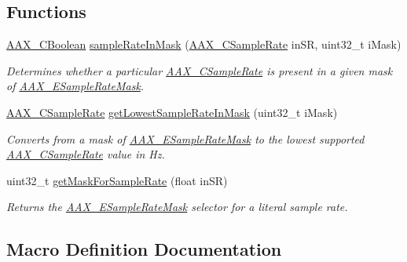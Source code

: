 \subsection*{Functions}
\begin{DoxyCompactItemize}
\item 
\mbox{\hyperlink{a00392_aa216506530f1d19a2965931ced2b274b}{A\+A\+X\+\_\+\+C\+Boolean}} \mbox{\hyperlink{a00392_adec37d03995016a9e25490d5785f0d8b}{sample\+Rate\+In\+Mask}} (\mbox{\hyperlink{a00392_a3d9eea08f47e0b0a23432e15baa4e885}{A\+A\+X\+\_\+\+C\+Sample\+Rate}} in\+SR, uint32\+\_\+t i\+Mask)
\begin{DoxyCompactList}\small\item\em Determines whether a particular \mbox{\hyperlink{a00392_a3d9eea08f47e0b0a23432e15baa4e885}{A\+A\+X\+\_\+\+C\+Sample\+Rate}} is present in a given mask of \mbox{\hyperlink{a00491_a5bb98259de21d2c4d04a2d6010d757c7}{A\+A\+X\+\_\+\+E\+Sample\+Rate\+Mask}}. \end{DoxyCompactList}\item 
\mbox{\hyperlink{a00392_a3d9eea08f47e0b0a23432e15baa4e885}{A\+A\+X\+\_\+\+C\+Sample\+Rate}} \mbox{\hyperlink{a00392_a7ed6789141267c2270b49ef9a38bd55a}{get\+Lowest\+Sample\+Rate\+In\+Mask}} (uint32\+\_\+t i\+Mask)
\begin{DoxyCompactList}\small\item\em Converts from a mask of \mbox{\hyperlink{a00491_a5bb98259de21d2c4d04a2d6010d757c7}{A\+A\+X\+\_\+\+E\+Sample\+Rate\+Mask}} to the lowest supported \mbox{\hyperlink{a00392_a3d9eea08f47e0b0a23432e15baa4e885}{A\+A\+X\+\_\+\+C\+Sample\+Rate}} value in Hz. \end{DoxyCompactList}\item 
uint32\+\_\+t \mbox{\hyperlink{a00392_a35608eb248567091abba77878fb87eab}{get\+Mask\+For\+Sample\+Rate}} (float in\+SR)
\begin{DoxyCompactList}\small\item\em Returns the \mbox{\hyperlink{a00491_a5bb98259de21d2c4d04a2d6010d757c7}{A\+A\+X\+\_\+\+E\+Sample\+Rate\+Mask}} selector for a literal sample rate. \end{DoxyCompactList}\end{DoxyCompactItemize}


\subsection{Macro Definition Documentation}
\mbox{\label{a00392_a5f58f7770d463d262cc28b0e7b88747b}} 
